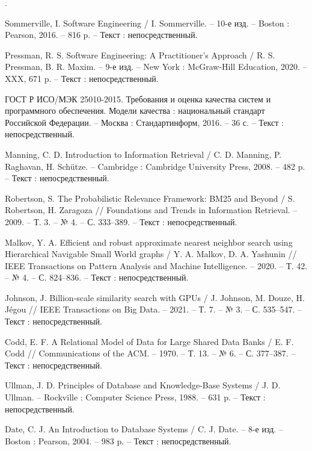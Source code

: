 \begin{list}{.}
\item Sommerville, I. Software Engineering / I. Sommerville. – 10-е изд. – Boston : Pearson, 2016. – 816 p. – Текст : непосредственный.

\item Pressman, R. S. Software Engineering: A Practitioner's Approach / R. S. Pressman, B. R. Maxim. – 9-е изд. – New York : McGraw-Hill Education, 2020. – XXX, 671 p. – Текст : непосредственный.

\item ГОСТ Р ИСО/МЭК 25010-2015. Требования и оценка качества систем и программного обеспечения. Модели качества : национальный стандарт Российской Федерации. – Москва : Стандартинформ, 2016. – 36 с. – Текст : непосредственный.

\item Manning, C. D. Introduction to Information Retrieval / C. D. Manning, P. Raghavan, H. Schütze. – Cambridge : Cambridge University Press, 2008. – 482 p. – Текст : непосредственный.

\item Robertson, S. The Probabilistic Relevance Framework: BM25 and Beyond / S. Robertson, H. Zaragoza // Foundations and Trends in Information Retrieval. – 2009. – Т. 3. – № 4. – С. 333–389. – Текст : непосредственный.

\item Malkov, Y. A. Efficient and robust approximate nearest neighbor search using Hierarchical Navigable Small World graphs / Y. A. Malkov, D. A. Yashunin // IEEE Transactions on Pattern Analysis and Machine Intelligence. – 2020. – Т. 42. – № 4. – С. 824–836. – Текст : непосредственный.

\item Johnson, J. Billion-scale similarity search with GPUs / J. Johnson, M. Douze, H. Jégou // IEEE Transactions on Big Data. – 2021. – Т. 7. – № 3. – С. 535–547. – Текст : непосредственный.

\item Codd, E. F. A Relational Model of Data for Large Shared Data Banks / E. F. Codd // Communications of the ACM. – 1970. – Т. 13. – № 6. – С. 377–387. – Текст : непосредственный.

\item Ullman, J. D. Principles of Database and Knowledge-Base Systems / J. D. Ullman. – Rockville : Computer Science Press, 1988. – 631 p. – Текст : непосредственный.

\item Date, C. J. An Introduction to Database Systems / C. J. Date. – 8-е изд. – Boston : Pearson, 2004. – 983 p. – Текст : непосредственный.


\end{list}
